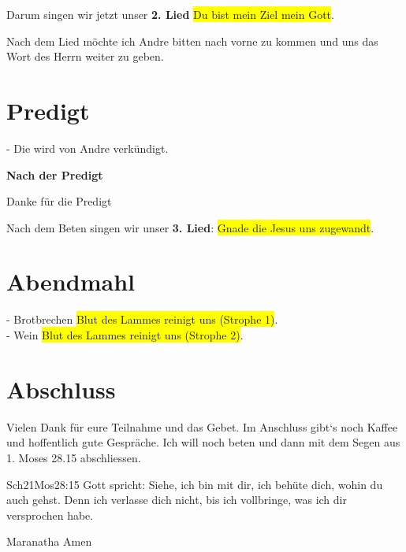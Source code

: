 \documentclass[12pt,a4paper]{scrarticle}
\begin{document}
\begin{spacing}{1.5}

\end{spacing}
Darum singen wir jetzt unser \textbf{2. Lied} \colorbox{yellow}{Du bist mein Ziel mein Gott}.

Nach dem Lied möchte ich Andre bitten nach vorne zu kommen und uns das Wort des Herrn weiter zu geben.

\section{Predigt}
- Die wird von Andre verkündigt.

\textbf{Nach der Predigt}

Danke für die Predigt

Nach dem Beten singen wir unser \textbf{3. Lied}: \colorbox{yellow}{Gnade die Jesus uns zugewandt}.\\

\section{Abendmahl}
- Brotbrechen
\colorbox{yellow}{Blut des Lammes reinigt uns (Strophe 1)}.\\
- Wein
\colorbox{yellow}{Blut des Lammes reinigt uns (Strophe 2)}.\\

\section{Abschluss}
Vielen Dank für eure Teilnahme und das Gebet. Im Anschluss gibt`s noch Kaffee und hoffentlich gute Gespräche.
Ich will noch beten und dann mit dem Segen aus 1. Moses 28.15 abschliessen.
\begin{bibeltext}{Sch2}{1Mos}{28:15}
Gott spricht: Siehe, ich bin mit dir,
ich behüte dich, wohin du auch gehst.
Denn ich verlasse dich nicht,
bis ich vollbringe, was ich dir versprochen habe.
\end{bibeltext}
Maranatha Amen
\end{document}
